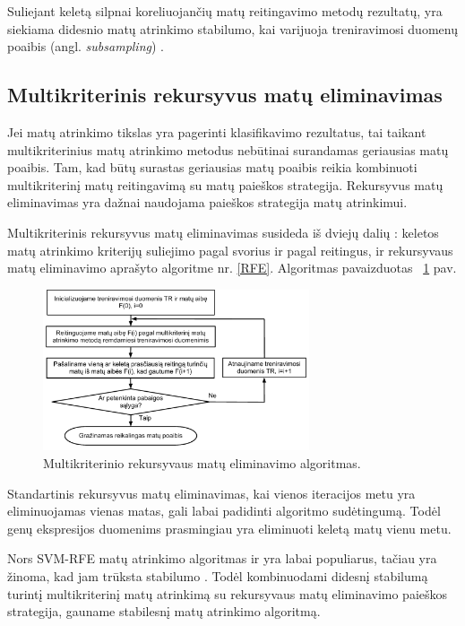 Suliejant keletą silpnai koreliuojančių matų reitingavimo metodų rezultatų, yra siekiama didesnio matų atrinkimo stabilumo, kai varijuoja treniravimosi duomenų poaibis (angl. \textit{subsampling}) \cite{yang2011robust}.

\subsection{Multikriterinis rekursyvus matų eliminavimas}

Jei matų atrinkimo tikslas yra pagerinti klasifikavimo rezultatus, tai taikant multikriterinius matų atrinkimo metodus nebūtinai surandamas geriausias matų poaibis. Tam, kad būtų surastas geriausias matų poaibis reikia kombinuoti multikriterinį matų reitingavimą su matų paieškos strategija. Rekursyvus matų eliminavimas yra dažnai naudojama paieškos strategija matų atrinkimui. 

Multikriterinis rekursyvus matų eliminavimas susideda iš dviejų dalių \cite{yang2011robust}: keletos matų atrinkimo kriterijų suliejimo pagal svorius ir pagal reitingus, ir rekursyvaus matų eliminavimo aprašyto algoritme nr. \ref{RFE}. Algoritmas pavaizduotas ~\ref{fig:figure6} pav.
\begin{figure}
 \centering
 \includegraphics[width=0.7\textwidth]{images/mcf-rfe_procedure.pdf}
 \caption{Multikriterinio rekursyvaus matų eliminavimo algoritmas.}
 \label{fig:figure6}
\end{figure}

Standartinis rekursyvus matų eliminavimas, kai vienos iteracijos metu yra eliminuojamas vienas matas, gali labai padidinti algoritmo sudėtingumą. Todėl genų ekspresijos duomenims prasmingiau yra eliminuoti keletą matų vienu metu.

Nors SVM-RFE matų atrinkimo algoritmas ir yra labai populiarus, tačiau yra žinoma, kad jam trūksta stabilumo \cite{guyon2002gene}. Todėl kombinuodami didesnį stabilumą turintį multikriterinį matų atrinkimą su rekursyvaus matų eliminavimo paieškos strategija, gauname stabilesnį matų atrinkimo algoritmą.

